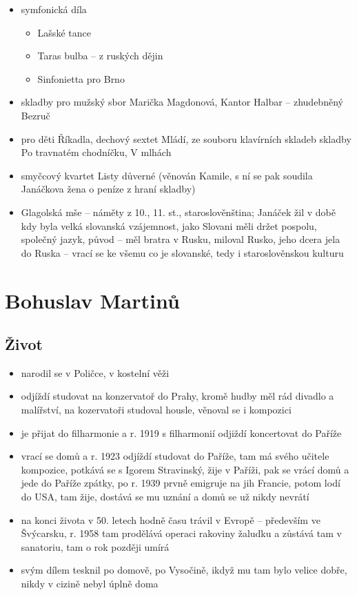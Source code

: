 \documentclass{article}
\begin{document}
\begin{itemize}
  \item symfonická díla
  \begin{itemize}
    \item Lašské tance
    \item Taras bulba -- z ruských dějin
    \item Sinfonietta pro Brno
  \end{itemize}
  \item skladby pro mužský sbor Marička Magdonová, Kantor Halbar -- zhudebněný Bezruč
  \item pro děti Říkadla, dechový sextet Mládí, ze souboru klavírních skladeb skladby Po travnatém chodníčku, V mlhách
  \item smyčcový kvartet Listy důverné (věnován Kamile, s ní se pak soudila Janáčkova žena o peníze z hraní skladby)
  \item Glagolská mše -- náměty z 10., 11. st., staroslověnština; Janáček žil v době kdy byla velká slovanská vzájemnost, jako Slovani měli držet pospolu, společný jazyk, původ -- měl bratra v Rusku, miloval Rusko, jeho dcera jela do Ruska -- vrací se ke všemu co je slovanské, tedy i staroslověnskou kulturu
\end{itemize}

\section{Bohuslav Martinů}
\subsection{Život}
\begin{itemize}
  \item narodil se v Poličce, v kostelní věži
  \item odjíždí studovat na konzervatoř do Prahy, kromě hudby měl rád divadlo a malířství, na kozervatoři studoval housle, věnoval se i kompozici
  \item je přijat do filharmonie a r. 1919 s filharmonií odjiždí koncertovat do Paříže
  \item vrací se domů a r. 1923 odjíždí studovat do Paříže, tam má svého učitele kompozice, potkává se s Igorem Stravinský, žije v Paříži, pak se vrácí domů a jede do Paříže zpátky, po r. 1939 prvně emigruje na jih Francie, potom lodí do USA, tam žije, dostává se mu uznání a domů se už nikdy nevrátí
  \item na konci života v 50. letech hodně času trávil v Evropě -- především ve Švýcarsku, r. 1958 tam prodělává operaci rakoviny žaludku a zůstává tam v sanatoriu, tam o rok později umírá
  \item svým dílem tesknil po domově, po Vysočině, ikdyž mu tam bylo velice dobře, nikdy v cizině nebyl úplně doma
\end{itemize}
\end{document}
